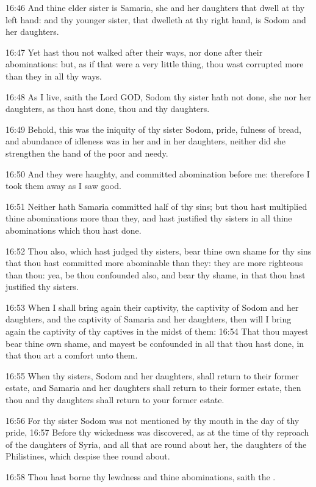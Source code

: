 16:46 And thine elder sister is Samaria, she and her daughters that dwell at thy left hand: and thy younger sister, that dwelleth at thy right hand, is Sodom and her daughters.

16:47 Yet hast thou not walked after their ways, nor done after their abominations: but, as if that were a very little thing, thou wast corrupted more than they in all thy ways.

16:48 As I live, saith the Lord GOD, Sodom thy sister hath not done, she nor her daughters, as thou hast done, thou and thy daughters.

16:49 Behold, this was the iniquity of thy sister Sodom, pride, fulness of bread, and abundance of idleness was in her and in her daughters, neither did she strengthen the hand of the poor and needy.

16:50 And they were haughty, and committed abomination before me: therefore I took them away as I saw good.

16:51 Neither hath Samaria committed half of thy sins; but thou hast multiplied thine abominations more than they, and hast justified thy sisters in all thine abominations which thou hast done.

16:52 Thou also, which hast judged thy sisters, bear thine own shame for thy sins that thou hast committed more abominable than they: they are more righteous than thou: yea, be thou confounded also, and bear thy shame, in that thou hast justified thy sisters.

16:53 When I shall bring again their captivity, the captivity of Sodom and her daughters, and the captivity of Samaria and her daughters, then will I bring again the captivity of thy captives in the midst of them: 16:54 That thou mayest bear thine own shame, and mayest be confounded in all that thou hast done, in that thou art a comfort unto them.

16:55 When thy sisters, Sodom and her daughters, shall return to their former estate, and Samaria and her daughters shall return to their former estate, then thou and thy daughters shall return to your former estate.

16:56 For thy sister Sodom was not mentioned by thy mouth in the day of thy pride, 16:57 Before thy wickedness was discovered, as at the time of thy reproach of the daughters of Syria, and all that are round about her, the daughters of the Philistines, which despise thee round about.

16:58 Thou hast borne thy lewdness and thine abominations, saith the \LORD.

